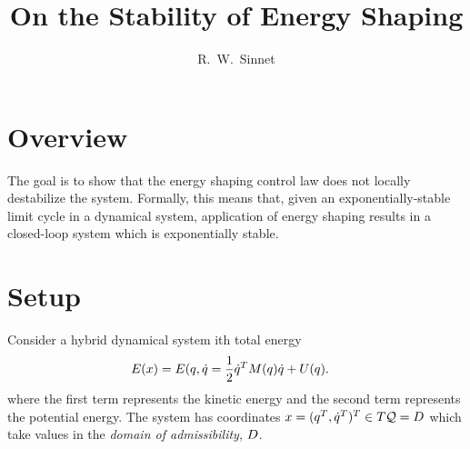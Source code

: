 \documentclass[twocolumn]{article}
\author{R.~W.~Sinnet}
\title{On the Stability of Energy Shaping}
\begin{document}
\maketitle
\thispagestyle{fancy}

\section*{Overview}
The goal is to show that the energy shaping control law does not locally destabilize the system.
%
Formally, this means that, given an exponentially-stable limit cycle in a dynamical system, application of energy shaping results in a closed-loop system which is exponentially stable.

\section{Setup}

Consider a hybrid dynamical system ith total energy
\begin{align*}
  E(x) &= E(q, \dot{q} = \frac{1}{2} \dot{q}^{T} M(q) \dot{q} + U(q).
\end{align*}
where the first term represents the kinetic energy and the second term represents the potential energy.
%
The system has coordinates $x = (q^T, \dot{q}^T)^T \in T\mathcal{Q} = D$ which take values in the {\em domain of admissibility}, $D$.
\end{document}
